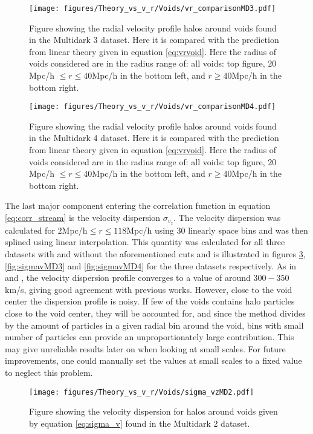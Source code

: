 \begin{figure}[H]
    \texttt{[image: figures/Theory\_vs\_v\_r/Voids/vr\_comparisonMD3.pdf]}
    \caption{Figure showing the radial velocity profile halos around voids found in the Multidark 3 dataset. Here it is compared with the prediction from linear theory given in equation \ref{eq:vrvoid}. Here the radius of voids considered are in the radius range of: all voids: top figure, $20$Mpc/h $\leq r\leq 40$Mpc/h in the bottom left, and $r\geq 40$Mpc/h in the bottom right.}
    \label{fig:vrMD3}
\end{figure}

\begin{figure}[H]
    \texttt{[image: figures/Theory\_vs\_v\_r/Voids/vr\_comparisonMD4.pdf]}
    \caption{Figure showing the radial velocity profile halos around voids found in the Multidark 4 dataset. Here it is compared with the prediction from linear theory given in equation \ref{eq:vrvoid}. Here the radius of voids considered are in the radius range of: all voids: top figure, $20$Mpc/h $\leq r\leq 40$Mpc/h in the bottom left, and $r\geq 40$Mpc/h in the bottom right.}
    \label{fig:vrMD4}
\end{figure}
The last major component entering the correlation function in equation \ref{eq:corr_stream} is the velocity dispersion $\sigma_{v_z}$. The velocity dispersion was calculated for $2$Mpc/h$\leq r\leq 118$Mpc/h using $30$ linearly space bins and was then splined using linear interpolation. This quantity was calculated for all three datasets with and without the aforementioned cuts and is illustrated in figures \ref{fig:sigmavMD2}, \ref{fig:sigmavMD3} and \ref{fig:sigmavMD4} for the three datasets respectively. As in \cite{Nadathur_corr} and \cite{Achitouv_streaming}, the velocity dispersion profile converges to a value of around $300-350$ km/s, giving good agreement with previous works. However, close to the void center the dispersion profile is noisy. If few of the voids contains halo particles close to the void center, they will be accounted for, and since the method divides by the amount of particles in a given radial bin around the void, bins with small number of particles can provide an unproportionately large contribution. This may give unreliable results later on when looking at small scales. For future improvements, one could manually set the values at small scales to a fixed value to neglect this problem.
\begin{figure}[H]
    \texttt{[image: figures/Theory\_vs\_v\_r/Voids/sigma\_vzMD2.pdf]}
    \caption{Figure showing the velocity dispersion for halos around voids given by equation \ref{eq:sigma_v} found in the Multidark 2 dataset.}
    \label{fig:sigmavMD2}
\end{figure}

